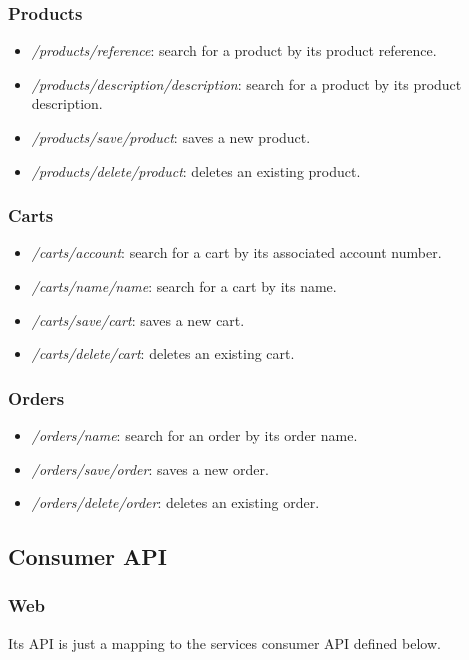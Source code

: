 \subsubsection{Products}
\begin{itemize}
	\item \textit{/products/{reference}}: search for a product by its product reference.
	\item \textit{/products/description/{description}}: search for a product by its product description.
	\item \textit{/products/save/{product}}: saves a new product.
	\item \textit{/products/delete/{product}}: deletes an existing product.
\end{itemize}

\subsubsection{Carts}
\begin{itemize}
	\item \textit{/carts/{account}}: search for a cart by its associated account number.
	\item \textit{/carts/name/{name}}: search for a cart by its name.
	\item \textit{/carts/save/{cart}}: saves a new cart.
	\item \textit{/carts/delete/{cart}}: deletes an existing cart.
\end{itemize}

\subsubsection{Orders}
\begin{itemize}
	\item \textit{/orders/{name}}: search for an order by its order name.
	\item \textit{/orders/save/{order}}: saves a new order.
	\item \textit{/orders/delete/{order}}: deletes an existing order.
\end{itemize}


\subsection{Consumer API}

\subsubsection{Web}
Its API is just a mapping to the services consumer API defined below.

